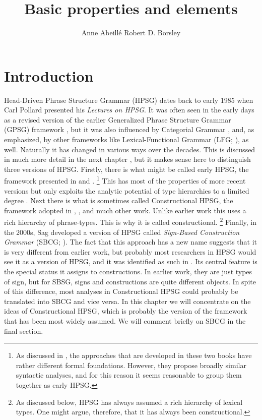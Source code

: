 \documentclass[output=paper
	        ,collection
	        ,collectionchapter
 	        ,biblatex
                ,babelshorthands
                ,newtxmath
                ,draftmode
                ,colorlinks, citecolor=brown
]{langscibook}
\title{Basic properties and elements}
\author{%
 Anne Abeillé\affiliation{Université Paris Diderot}%
 \lastand Robert D. Borsley\affiliation{University of Essex}%
}
\begin{document}
\maketitle
\label{chapter-basic-properties}\label{chap-properties}


\section{Introduction}\label{sec:prop1}
\label{prop:sec-intro}

Head-Driven Phrase Structure Grammar (HPSG) dates back to early 1985 when Carl Pollard presented his \emph{Lectures on HPSG}. It was often seen in the early days as a revised version of the earlier Generalized Phrase Structure Grammar (GPSG) framework \citep*{GKPS85a}, but it was also influenced by Categorial Grammar \citep{Ajdukiewicz35a-u,Steedman2000a-u}, and, as \citet[1]{ps} emphasized, by other frameworks like Lexical-Functional Grammar (LFG; \citealt{Bresnan82a-ed}), as well. Naturally it has changed in various ways over the decades. This is discussed in much more detail in the next chapter , but it makes sense here to distinguish three versions of HPSG. Firstly, there is what might be called early HPSG, the framework presented in \citet{ps} and \citet{ps2}.%
%
\footnote{As discussed in , the approaches that are developed in these two books have rather different formal foundations. However, they propose broadly similar syntactic analyses, and for this reason it seems reasonable to group them together as early HPSG.}
%
This has most of the properties of more recent versions but only exploits the analytic potential of type hierarchies to a limited degree \citep*{Flickinger87,FPW85a}. Next there is what is sometimes called Constructional HPSG, the framework adopted in , , and much other work. Unlike earlier work this uses a rich hierarchy of phrase-types. This is why it is called constructional.%
%
\footnote{As discussed below, HPSG has always assumed a rich hierarchy of lexical types. One might argue, therefore, that it has always been constructional.}
%
Finally, in the 2000s, Sag developed a version of HPSG called \emph{Sign-Based Construction Grammar}
(SBCG; \citealt{Sag2012a}). The fact that this approach has a new name suggests that it is very
different from earlier work, but probably most researchers in HPSG would see it as a version of
HPSG, and it was identified as such in \citet[486]{Sag2010b}. Its central feature is the special
status it assigns to constructions. In earlier work, they are just types of sign, but for SBSG,
signs and constructions are quite different objects. In spite of this difference, most analyses in
Constructional HPSG could probably be translated into SBCG and vice versa. In this chapter we will
concentrate on the ideas of Constructional HPSG, which is probably the version of the framework that
has been most widely assumed. We will comment briefly on SBCG in the final section. 
\end{document}
